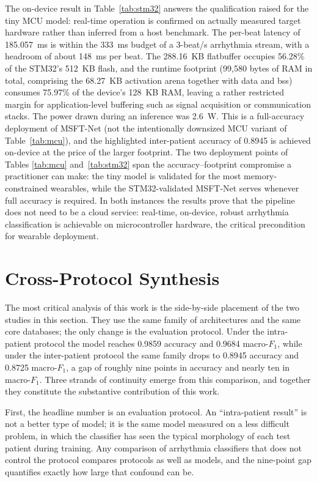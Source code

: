 The on-device result in Table~\ref{tab:stm32} answers the qualification
raised for the tiny MCU model: real-time operation is confirmed on actually
measured target hardware rather than inferred from a host benchmark. The
per-beat latency of 185.057~ms is within the 333~ms budget of a 3-beat/s
arrhythmia stream, with a headroom of about 148~ms per beat. The 288.16~KB
flatbuffer occupies 56.28\% of the STM32's 512~KB flash, and the runtime
footprint (99{,}580 bytes of RAM in total, comprising the 68.27~KB
activation arena together with data and bss) consumes 75.97\% of the
device's 128~KB RAM, leaving a rather
restricted margin for application-level buffering such as signal
acquisition or communication stacks. The power drawn during an inference
was 2.6~W. This is a full-accuracy deployment of MSFT-Net (not the
intentionally downsized MCU variant of Table~\ref{tab:mcu}), and the
highlighted inter-patient accuracy of 0.8945 is achieved on-device at the
price of the larger footprint. The two deployment points of Tables
\ref{tab:mcu} and~\ref{tab:stm32} span the accuracy--footprint compromise a
practitioner can make: the tiny model is validated for the most
memory-constrained wearables, while the STM32-validated MSFT-Net serves
whenever full accuracy is required. In both instances the results prove
that the pipeline does not need to be a cloud service: real-time,
on-device, robust arrhythmia classification is achievable on
microcontroller hardware, the critical precondition for wearable
deployment.


\section{Cross-Protocol Synthesis}
\label{sec:crossprotocol}

The most critical analysis of this work is the side-by-side placement of
the two studies in this section. They use the same family of architectures
and the same core databases; the only change is the evaluation protocol.
Under the intra-patient protocol the model reaches 0.9859 accuracy and
0.9684 macro-$F_1$, while under the inter-patient protocol the same family
drops to 0.8945 accuracy and 0.8725 macro-$F_1$, a gap of roughly nine
points in accuracy and nearly ten in macro-$F_1$. Three strands of
continuity emerge from this comparison, and together they constitute the
substantive contribution of this work.

First, the headline number is an evaluation protocol. An ``intra-patient
result'' is not a better type of model; it is the same model measured on a
less difficult problem, in which the classifier has seen the typical
morphology of each test patient during training. Any comparison of
arrhythmia classifiers that does not control the protocol compares protocols
as well as models, and the nine-point gap quantifies exactly how large that
confound can be.


